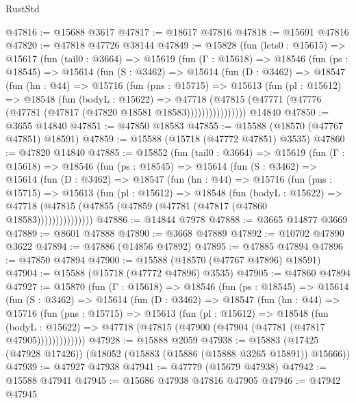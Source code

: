 \begin{lexlean}{RustStd}
\begin{coremodule}
@47816 := @15688 @3617
@47817 := @18617 @47816
@47818 := @15691 @47816
@47820 := @47818 @47726 @38144
@47849 := @15828
    (fun (lets0 : @15615) =>
    @15617
      (fun (tail0 : @3664) =>
      @15619
        (fun (Γ : @15618) =>
        @18546
          (fun (ps : @18545) =>
          @15614
            (fun (S : @3462) =>
            @15614
              (fun (D : @3462) =>
              @18547
                (fun (hn : @44) =>
                @15716
                  (fun (pns : @15715) =>
                  @15613
                    (fun (pl : @15612) =>
                    @18548
                      (fun (bodyL : @15622) =>
                      @47718
                        (@47815
                          (@47771 (@47776 (@47781 (@47817 (@47820 @18581 @18583))))))))))))))))
    @14840
@47850 := @3655 @14840
@47851 := @47850 @18583
@47855 := @15588 (@18570 (@47767 @47851) @18591)
@47859 := @15588 (@15718 (@47772 @47851) @3535)
@47860 := @47820 @14840
@47885 := @15852
    (fun (tail0 : @3664) =>
    @15619
      (fun (Γ : @15618) =>
      @18546
        (fun (ps : @18545) =>
        @15614
          (fun (S : @3462) =>
          @15614
            (fun (D : @3462) =>
            @18547
              (fun (hn : @44) =>
              @15716
                (fun (pns : @15715) =>
                @15613
                  (fun (pl : @15612) =>
                  @18548
                    (fun (bodyL : @15622) =>
                    @47718 (@47815 (@47855 (@47859 (@47781 (@47817 (@47860 @18583)))))))))))))))
@47886 := @14844 @7978
@47888 := @3665 @14877 @3669
@47889 := @8601 @47888
@47890 := @3668 @47889
@47892 := @10702 @47890 @3622
@47894 := @47886 (@14856 @47892)
@47895 := @47885 @47894
@47896 := @47850 @47894
@47900 := @15588 (@18570 (@47767 @47896) @18591)
@47904 := @15588 (@15718 (@47772 @47896) @3535)
@47905 := @47860 @47894
@47927 := @15870
    (fun (Γ : @15618) =>
    @18546
      (fun (ps : @18545) =>
      @15614
        (fun (S : @3462) =>
        @15614
          (fun (D : @3462) =>
          @18547
            (fun (hn : @44) =>
            @15716
              (fun (pns : @15715) =>
              @15613
                (fun (pl : @15612) =>
                @18548
                  (fun (bodyL : @15622) =>
                  @47718 (@47815 (@47900 (@47904 (@47781 (@47817 @47905)))))))))))))
@47928 := @15888 @2059
@47938 := @15883 (@17425 (@47928 @17426)) (@18052 (@15883 (@15886 (@15888 @3265 @15891)) @15666))
@47939 := @47927 @47938
@47941 := @47779 (@15679 @47938)
@47942 := @15588 @47941
@47945 := @15686 @47938 @47816 @47905
@47946 := @47942 @47945

\end{coremodule}
\end{lexlean}
